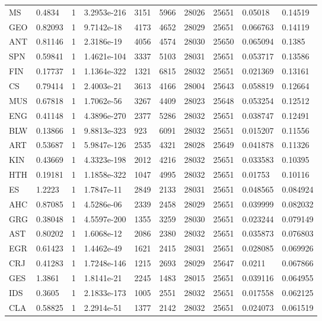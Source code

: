 {\begin{longtable}{llllllllll}
MS & 0.4834 & 1 & 3.2953e-216 & 3151 & 5966 & 28026 & 25651 & 0.05018 & 0.14519 \\ 
GEO & 0.82093 & 1 & 9.7142e-18 & 4173 & 4652 & 28029 & 25651 & 0.066763 & 0.14119 \\ 
ANT & 0.81146 & 1 & 2.3186e-19 & 4056 & 4574 & 28030 & 25650 & 0.065094 & 0.1385 \\ 
SPN & 0.59841 & 1 & 1.4621e-104 & 3337 & 5103 & 28031 & 25651 & 0.053717 & 0.13586 \\ 
FIN & 0.17737 & 1 & 1.1364e-322 & 1321 & 6815 & 28032 & 25651 & 0.021369 & 0.13161 \\ 
CS & 0.79414 & 1 & 2.4003e-21 & 3613 & 4166 & 28004 & 25643 & 0.058819 & 0.12664 \\ 
MUS & 0.67818 & 1 & 1.7062e-56 & 3267 & 4409 & 28023 & 25648 & 0.053254 & 0.12512 \\ 
ENG & 0.41148 & 1 & 4.3896e-270 & 2377 & 5286 & 28032 & 25651 & 0.038747 & 0.12491 \\ 
BLW & 0.13866 & 1 & 9.8813e-323 & 923 & 6091 & 28032 & 25651 & 0.015207 & 0.11556 \\ 
ART & 0.53687 & 1 & 5.9847e-126 & 2535 & 4321 & 28028 & 25649 & 0.041878 & 0.11326 \\ 
KIN & 0.43669 & 1 & 4.3323e-198 & 2012 & 4216 & 28032 & 25651 & 0.033583 & 0.10395 \\ 
HTH & 0.19181 & 1 & 1.1858e-322 & 1047 & 4995 & 28032 & 25651 & 0.01753 & 0.10116 \\ 
ES & 1.2223 & 1 & 1.7847e-11 & 2849 & 2133 & 28031 & 25651 & 0.048565 & 0.084924 \\ 
AHC & 0.87085 & 1 & 4.5286e-06 & 2339 & 2458 & 28029 & 25651 & 0.039999 & 0.082032 \\ 
GRG & 0.38048 & 1 & 4.5597e-200 & 1355 & 3259 & 28030 & 25651 & 0.023244 & 0.079149 \\ 
AST & 0.80202 & 1 & 1.6068e-12 & 2086 & 2380 & 28032 & 25651 & 0.035873 & 0.076803 \\ 
EGR & 0.61423 & 1 & 1.4462e-49 & 1621 & 2415 & 28031 & 25651 & 0.028085 & 0.069926 \\ 
CRJ & 0.41283 & 1 & 1.7248e-146 & 1215 & 2693 & 28029 & 25647 & 0.0211 & 0.067866 \\ 
GES & 1.3861 & 1 & 1.8141e-21 & 2245 & 1483 & 28015 & 25651 & 0.039116 & 0.064955 \\ 
IDS & 0.3605 & 1 & 2.1833e-173 & 1005 & 2551 & 28032 & 25651 & 0.017558 & 0.062125 \\ 
CLA & 0.58825 & 1 & 2.2914e-51 & 1377 & 2142 & 28032 & 25651 & 0.024073 & 0.061519 \\ 

\end{longtable}}
